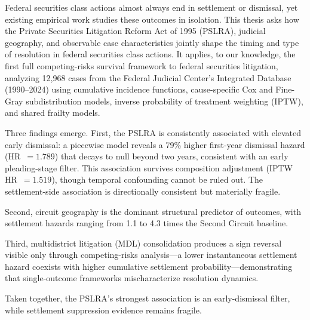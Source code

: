 Federal securities class actions almost always end in settlement or
dismissal, yet existing empirical work studies these outcomes in
isolation. This thesis asks how the Private Securities Litigation
Reform Act of 1995 (PSLRA), judicial geography, and observable case characteristics
jointly shape the timing and type of resolution in federal securities class actions.
It applies, to our knowledge, the first full
competing-risks survival framework to federal securities litigation,
analyzing 12,968 cases from the Federal Judicial Center's Integrated
Database (1990--2024) using cumulative incidence functions,
cause-specific Cox and Fine-Gray subdistribution models, inverse
probability of treatment weighting (IPTW), and shared frailty
models.

Three findings emerge. First, the PSLRA is consistently associated
with elevated early dismissal: a piecewise model reveals a 79\%
higher first-year dismissal hazard (HR~$= 1.789$) that decays to
null beyond two years, consistent with an early pleading-stage
filter. This association survives composition adjustment (IPTW
HR~$= 1.519$), though temporal confounding cannot be ruled out. The
settlement-side association is directionally consistent but
materially fragile.

Second, circuit geography is the dominant structural predictor of
outcomes, with settlement hazards ranging from 1.1 to 4.3 times the
Second Circuit baseline.

Third, multidistrict litigation (MDL) consolidation produces a sign
reversal visible only through competing-risks analysis---a lower
instantaneous settlement hazard coexists with higher cumulative
settlement probability---demonstrating that single-outcome
frameworks mischaracterize resolution dynamics.

Taken together, the PSLRA's strongest association is an
early-dismissal filter, while settlement suppression evidence
remains fragile.
